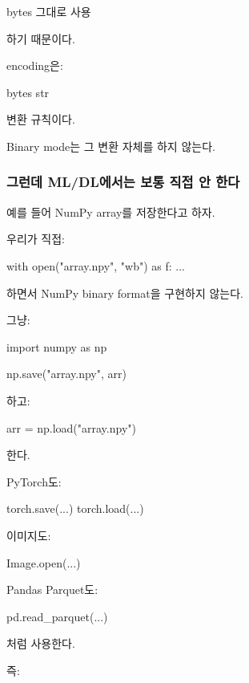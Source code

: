 \begin{dhksmry}[centered]
bytes
\da
그대로 사용
\end{dhksmry}

하기 때문이다.

encoding은:

\begin{dhksmry}
bytes \lra str
\end{dhksmry}

변환 규칙이다.

Binary mode는 그 변환 자체를 하지 않는다.

\subsubsection{그런데 ML/DL에서는 보통 직접 안 한다}

예를 들어 NumPy array를 저장한다고 하자.

우리가 직접:

\begin{dhkcode}
with open("array.npy", "wb") as f:
    ...
\end{dhkcode}

하면서 NumPy binary format을 구현하지 않는다.

그냥:

\begin{dhkcode}
import numpy as np

np.save("array.npy", arr)
\end{dhkcode}

하고:

\begin{dhkcode}
arr = np.load("array.npy")
\end{dhkcode}

한다.

PyTorch도:

\begin{dhkcode}
torch.save(...)
torch.load(...)
\end{dhkcode}

이미지도:

\begin{dhkcode}
Image.open(...)
\end{dhkcode}

Pandas Parquet도:

\begin{dhkcode}
pd.read_parquet(...)
\end{dhkcode}

처럼 사용한다.

즉:

